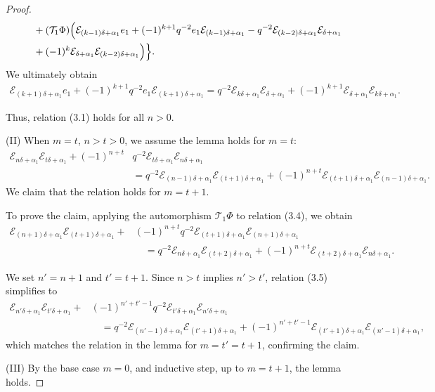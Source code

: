 \documentclass[12pt]{amsart}
\numberwithin{equation}{section}
\numberwithin{equation}{section}
\begin{document}
\begin{proof}
\begin{align*}
&\quad+(\mathcal{T}_1\Phi)\Bigl(\mathcal{E}_{(k-1)\delta+\alpha_{1}}e_1+(-1)^{k+1}q^{-2}e_1\mathcal{E}_{(k-1)\delta+\alpha_{1}}-q^{-2}\mathcal{E}_{(k-2)\delta+\alpha_{1}}\mathcal{E}_{\delta+\alpha_{1}}\\ 
&\quad+(-1)^{k}\mathcal{E}_{\delta+\alpha_{1}}\mathcal{E}_{(k-2)\delta+\alpha_{1}}\Bigr)\Bigr\}.
\end{align*}
We ultimately obtain  
\begin{align*}
\mathcal{E}_{(k+1)\delta+\alpha_{1}}e_{1}+(-1)^{k+1}q^{-2}e_{1}\mathcal{E}_{(k+1)\delta+\alpha_{1}}
=q^{-2}\mathcal{E}_{k\delta+\alpha_{1}}\mathcal{E}_{\delta+\alpha_{1}}+(-1)^{k+1}\mathcal{E}_{\delta+\alpha_{1}}\mathcal{E}_{k\delta+\alpha_{1}}.
\end{align*}

Thus, relation (3.1) holds for all \(n > 0\).

(II) When \(m=t\), \(n>t>0\), we assume the lemma holds for \(m=t\):
\begin{align}
\mathcal{E}_{n\delta+\alpha_1} \mathcal{E}_{t\delta+\alpha_1} + (-1)^{n+t}& q^{-2} \mathcal{E}_{t\delta+\alpha_1} \mathcal{E}_{n\delta+\alpha_1} \nonumber\\
&= q^{-2} \mathcal{E}_{(n-1)\delta+\alpha_1} \mathcal{E}_{(t+1)\delta+\alpha_1} + (-1)^{n+t} \mathcal{E}_{(t+1)\delta+\alpha_1} \mathcal{E}_{(n-1)\delta+\alpha_1}.
\end{align}
We claim that the relation holds for \(m=t+1\).

To prove the claim, applying the automorphism \(\mathcal{T}_1\Phi\) to relation (3.4), we obtain
\begin{align}
\mathcal{E}_{(n+1)\delta+\alpha_1} \mathcal{E}_{(t+1)\delta+\alpha_1} + &(-1)^{n+t}q^{-2} \mathcal{E}_{(t+1)\delta+\alpha_1} \mathcal{E}_{(n+1)\delta+\alpha_1} \nonumber\\
&\quad = q^{-2} \mathcal{E}_{n\delta+\alpha_1}\mathcal{E}_{(t+2)\delta+\alpha_1} + (-1)^{n+t} \mathcal{E}_{(t+2)\delta+\alpha_1} \mathcal{E}_{n\delta+\alpha_1}.
\end{align}

We set \(n' = n+1\) and \(t' = t+1\). Since \(n > t\) implies \(n' > t'\), relation (3.5) simplifies to
\[
\begin{aligned}
\mathcal{E}_{n'\delta+\alpha_1} \mathcal{E}_{t'\delta+\alpha_1} + &(-1)^{n'+t'-1} q^{-2} \mathcal{E}_{t'\delta+\alpha_1} \mathcal{E}_{n'\delta+\alpha_1} \\
&\quad = q^{-2} \mathcal{E}_{(n'-1)\delta+\alpha_1} \mathcal{E}_{(t'+1)\delta+\alpha_1} + (-1)^{n'+t'-1} \mathcal{E}_{(t'+1)\delta+\alpha_1} \mathcal{E}_{(n'-1)\delta+\alpha_1},
\end{aligned}
\]
which matches the relation in the lemma for \(m = t' = t+1\), confirming the claim.

(III)
By the base case \(m = 0\), and inductive step, up to \(m = t+1\), the lemma holds.
\end{proof}
\end{document}
